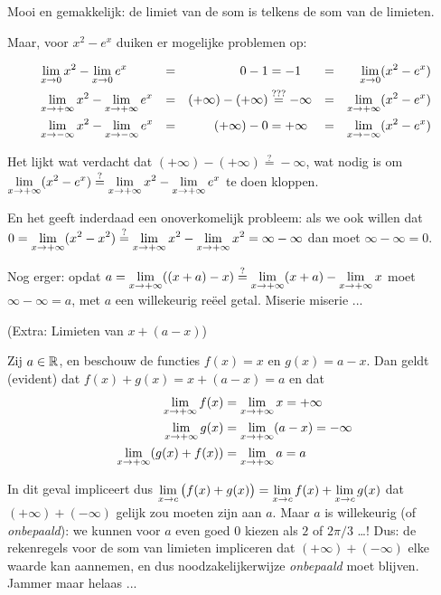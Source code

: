 \documentclass{ximera}
\begin{document}
\begin{example}
	Mooi en gemakkelijk: de limiet van de som is telkens de som van de limieten.
	
	Maar, voor $x^2 - e^x$ duiken er mogelijke problemen op:
	
	\begin{align*}	
	&\limx x^2 - \limx e^x  &=&& 0 - 1 &= -1 &=&& \limx (x^2-e^x) \\
	&\limxi x^2 - \limxi e^x  &=&& (+\infty)-(+\infty) &\overset{???}{=} -\infty &=&& \limxi (x^2-e^x)  \\
	&\limxmi x^2 - \limxmi e^x  &=&& (+\infty)-0  &=  +\infty &=&& \limxmi (x^2-e^x)
	\end{align*}
	
	Het lijkt wat verdacht dat $(+\infty) - (+\infty)  \overset{?}{=} -\infty$, wat nodig is om $\limxi (x^2-e^x)  \overset{?}{=} \limxi x^2  - \limxi e^x$ te doen kloppen.  
	
	En het geeft inderdaad een onoverkomelijk probleem: als we ook willen dat $0 = \limxi (x^2  - x^2)  \overset{?}{=} \limxi x^2  - \limxi x^2  = \infty - \infty$  dan moet $\infty - \infty = 0$. 
	
	Nog erger: opdat $a = \limxi ((x+a) - x) \overset{?}{=} \limxi (x+a) - \limxi x$ moet $\infty - \infty = a$, met $a$ een willekeurig reëel getal. Miserie miserie ...  

\end{example}
\begin{example}(Extra: Limieten van $x + (a-x)$)
	
	Zij $a\in\mathbb{R}$, en beschouw de functies $f(x)=x$ en $g(x)=a-x$. Dan geldt (evident) dat $f(x)+g(x)=x+(a-x)=a$ en dat 
	\begin{align*}
	\limxi f(x) & = \limxi x = +\infty \\
	\limxi g(x) & = \limxi (a-x) = -\infty \\
	\limxi (g(x)+f(x)) & = \limxi a = a \\
	\end{align*}
	
	
	In dit geval impliceert dus $\limxc \big(f(x) +g(x)\big) = \limxc f(x) + \limxc g(x)$ dat $(+\infty) + (-\infty)$ gelijk zou moeten zijn aan $a$. Maar $a$ is willekeurig (of \textit{onbepaald}): we kunnen voor $a$ even goed $0$ kiezen als $2$ of $2\pi/3$ \dots! Dus: de rekenregels voor de som van limieten impliceren dat $(+\infty)+(-\infty)$ elke waarde kan aannemen, en dus noodzakelijkerwijze \textit{onbepaald} moet blijven. Jammer maar helaas ...
	
	
\end{example}
\end{document}
